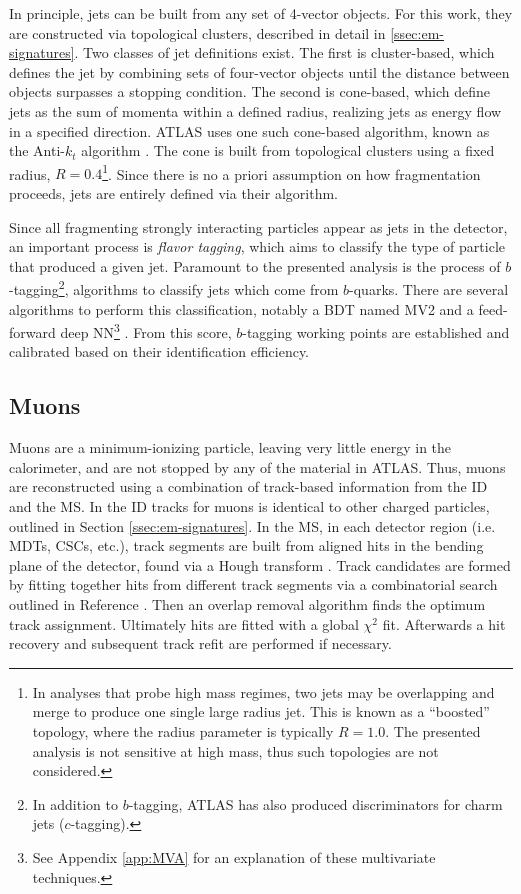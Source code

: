 In principle, jets can be built from any set of 4-vector objects. For this work, they are constructed via topological clusters, described in detail in \ref{ssec:em-signatures}. Two classes of jet definitions exist. The first is cluster-based, which defines the jet by combining sets of four-vector objects until the distance between objects surpasses a stopping condition. The second is cone-based, which define jets as the sum of momenta within a defined radius, realizing jets as energy flow in a specified direction. ATLAS uses one such cone-based algorithm, known as the Anti-$k_t$ algorithm \cite{anti-kt}. The cone is built from topological clusters using a fixed radius, $R=0.4$\footnote{In analyses that probe high mass regimes, two jets may be overlapping and merge to produce one single large radius jet. This is known as a ``boosted'' topology, where the radius parameter is typically $R=1.0$. The presented analysis is not sensitive at high mass, thus such topologies are not considered.}. Since there is no a priori assumption on how fragmentation proceeds, jets are entirely defined via their algorithm.


Since all fragmenting strongly interacting particles appear as jets in the detector, an important process is \textit{flavor tagging}, which aims to classify the type of particle that produced a given jet. Paramount to the presented analysis is the process of $b$-tagging\footnote{In addition to $b$-tagging, ATLAS has also produced discriminators for charm jets ($c$-tagging).}, algorithms to classify jets which come from $b$-quarks. There are several algorithms to perform this classification, notably a \gls{BDT} named MV2 \cite{mv2-dl1} and a feed-forward deep \gls{NN}\footnote{See Appendix \ref{app:MVA} for an explanation of these multivariate techniques.} \cite{mv2-dl1}. From this score, $b$-tagging working points are established and calibrated based on their identification efficiency. 


\subsection{Muons} \label{ssec:muon-reco}

Muons are a minimum-ionizing particle, leaving very little energy in the calorimeter, and are not stopped by any of the material in ATLAS. Thus, muons are reconstructed using a combination of track-based information from the \gls{ID} and the \gls{MS}. In the \gls{ID} tracks for muons is identical to other charged particles, outlined in Section \ref{ssec:em-signatures}. In the \gls{MS}, in each detector region (i.e. \glspl{MDT}, \glspl{CSC}, etc.), track segments are built from aligned hits in the bending plane of the detector, found via a Hough transform \cite{hough-transf}. Track candidates are formed by fitting together hits from different track segments via a combinatorial search outlined in Reference \cite{muon-reco}. Then an overlap removal algorithm finds the optimum track assignment. Ultimately hits are fitted with a global $\chi^2$ fit. Afterwards a hit recovery and subsequent track refit are performed if necessary.

